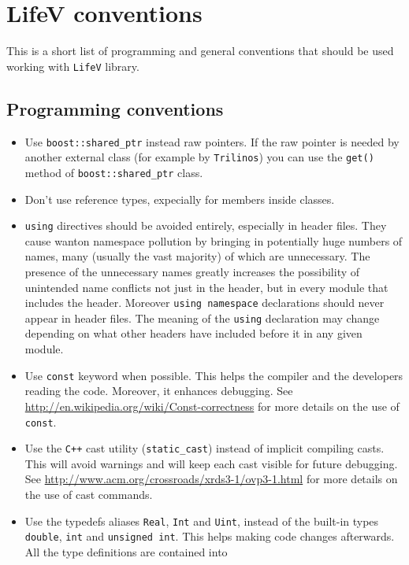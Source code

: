 \documentclass[a4paper]{article}
\begin{document}
\newpage
\section{LifeV conventions}
This is a short list of programming and general conventions that should be used
working with \texttt{LifeV} library.

\subsection{Programming conventions}
\begin{itemize}
  \item Use \texttt{boost::shared\_ptr} instead raw pointers. If the raw
  pointer is needed by another external class (for example by \texttt{Trilinos})
  you can use the \texttt{get()} method of \texttt{boost::shared\_ptr} class.
  \item Don't use reference types, expecially for members inside classes.
  \item \texttt{using} directives should be avoided entirely, especially in
  header files. They cause wanton namespace pollution 
  by bringing in potentially huge numbers of names, many (usually the vast
  majority) of which are unnecessary. The presence of the unnecessary names
  greatly increases the possibility of unintended name conflicts not just in
  the header, but in every module that includes the header. Moreover
  \texttt{using namespace} declarations should never appear in header files.
  The meaning of the \texttt{using} declaration may change depending on what
  other headers have included before it in any given module.
  \item Use \texttt{const} keyword when possible. This helps the compiler
  and the developers reading the code. Moreover, it enhances
  debugging. See \url{http://en.wikipedia.org/wiki/Const-correctness} for more
  details on the use of \texttt{const}.
  \item Use the \texttt{C++} cast utility (\texttt{static\_cast}) instead of
  implicit compiling casts. This will avoid warnings and will keep
  each cast visible for future debugging. See
  \url{http://www.acm.org/crossroads/xrds3-1/ovp3-1.html} for more details on
  the use of cast commands.
  \item Use the typedefs aliases \texttt{Real}, \texttt{Int} and
  \texttt{Uint}, instead of the built-in types \texttt{double},
  \texttt{int} and \texttt{unsigned int}. This helps making code
  changes afterwards. All the type definitions are contained into

\end{itemize}
\end{document}
